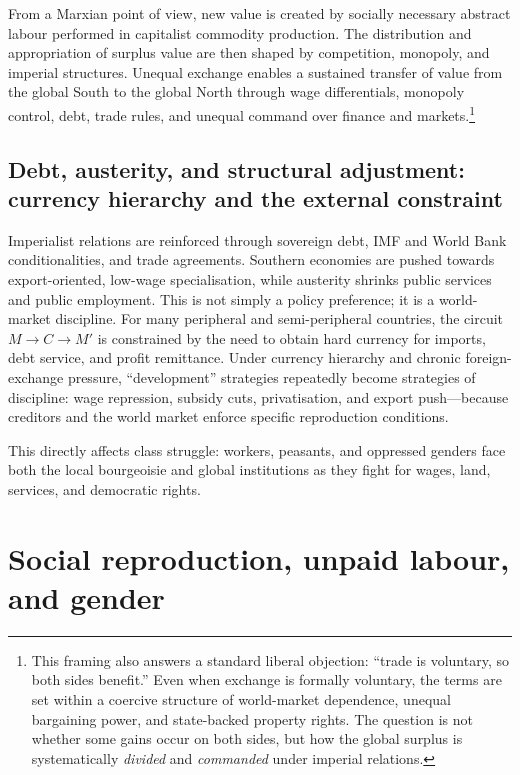 From a Marxian point of view, new value is created by socially necessary abstract labour
performed in capitalist commodity production. The distribution and appropriation of
surplus value are then shaped by competition, monopoly, and imperial structures. Unequal exchange enables a sustained transfer of value from the global South to the global North through wage differentials, monopoly control, debt, trade rules, and unequal command over finance and markets.\footnote{This framing
also answers a standard liberal objection: ``trade is voluntary, so both sides benefit.'' Even when exchange is formally voluntary, the terms are set within a coercive structure of
world-market dependence, unequal bargaining power, and state-backed property rights. The question is not whether some gains occur on both sides, but how the global surplus is systematically
\emph{divided} and \emph{commanded} under imperial relations.}



\subsection{Debt, austerity, and structural adjustment: currency hierarchy and the external constraint}
\label{sec:debt-austerity-structural-adjustment}

Imperialist relations are reinforced through sovereign debt, IMF and World Bank conditionalities, and trade agreements.
Southern economies are pushed towards export-oriented, low-wage specialisation, while austerity shrinks public services and
public employment.\cite{StrugglePK_WorldPerspectives}
This is not simply a policy preference; it is a world-market discipline. For many peripheral and semi-peripheral countries,
the circuit \(M \rightarrow C \rightarrow M'\) is constrained by the need to obtain hard currency for imports, debt service,
and profit remittance. Under currency hierarchy and chronic foreign-exchange pressure, ``development'' strategies repeatedly
become strategies of discipline: wage repression, subsidy cuts, privatisation, and export push---because creditors and the world market enforce specific reproduction conditions.\cite{PeetUnholyTrinity,IMFPakistan2026}

This directly affects class struggle: workers, peasants, and oppressed genders face both the local bourgeoisie and global institutions
as they fight for wages, land, services, and democratic rights.

\section{Social reproduction, unpaid labour, and gender}
\label{sec:social-reproduction}


